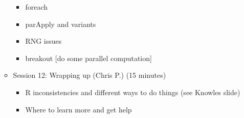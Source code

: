 \documentclass[12pt]{article}\usepackage{graphicx, color}
\begin{document}
\begin{itemize}
\begin{itemize}
\begin{itemize}
\item foreach
\item parApply and variants
\item RNG issues
\item breakout {[}do some parallel computation{]}
\end{itemize}
\item Session 12: Wrapping up (Chris P.) (15 minutes)

\begin{itemize}
\item R inconsistencies and different ways to do things (see Knowles slide)
\item Where to learn more and get help\end{itemize}
\end{itemize}
\end{itemize}
\end{document}
